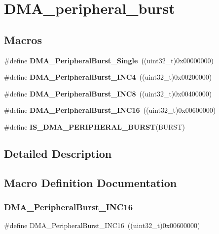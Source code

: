 \section{D\+M\+A\+\_\+peripheral\+\_\+burst}
\label{group__DMA__peripheral__burst}
\subsection*{Macros}
\begin{DoxyCompactItemize}
\item 
\#define \textbf{ D\+M\+A\+\_\+\+Peripheral\+Burst\+\_\+\+Single}~((uint32\+\_\+t)0x00000000)
\item 
\#define \textbf{ D\+M\+A\+\_\+\+Peripheral\+Burst\+\_\+\+I\+N\+C4}~((uint32\+\_\+t)0x00200000)
\item 
\#define \textbf{ D\+M\+A\+\_\+\+Peripheral\+Burst\+\_\+\+I\+N\+C8}~((uint32\+\_\+t)0x00400000)
\item 
\#define \textbf{ D\+M\+A\+\_\+\+Peripheral\+Burst\+\_\+\+I\+N\+C16}~((uint32\+\_\+t)0x00600000)
\item 
\#define \textbf{ I\+S\+\_\+\+D\+M\+A\+\_\+\+P\+E\+R\+I\+P\+H\+E\+R\+A\+L\+\_\+\+B\+U\+R\+ST}(B\+U\+R\+ST)
\end{DoxyCompactItemize}


\subsection{Detailed Description}


\subsection{Macro Definition Documentation}
\mbox{\label{group__DMA__peripheral__burst_ga04ff56ff0a2a5470fc2c4817be4213c2}} 
\subsubsection{D\+M\+A\+\_\+\+Peripheral\+Burst\+\_\+\+I\+N\+C16}
{\footnotesize\ttfamily \#define D\+M\+A\+\_\+\+Peripheral\+Burst\+\_\+\+I\+N\+C16~((uint32\+\_\+t)0x00600000)}



